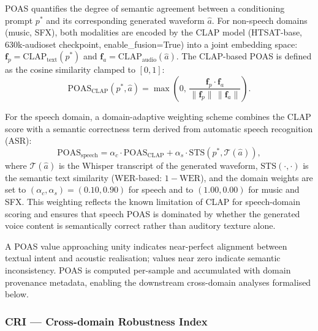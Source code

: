 \documentclass[journal]{IEEEtran}
\begin{document}
POAS quantifies the degree of semantic agreement between a
conditioning prompt $p^*$ and its corresponding generated waveform $\hat{a}$.
For non-speech domains (music, SFX), both modalities are encoded by
the CLAP model (HTSAT-base, 630k-audioset checkpoint, enable\_fusion=True)
into a joint embedding space:
$\mathbf{f}_p = \text{CLAP}_{\text{text}}(p^*)$ and
$\mathbf{f}_a = \text{CLAP}_{\text{audio}}(\hat{a})$. The CLAP-based
POAS is defined as the cosine similarity clamped to $[0,1]$:
\begin{equation}
  \text{POAS}_{\text{CLAP}}(p^*, \hat{a}) =
  \max\!\left(0,\,
  \frac{\mathbf{f}_p \cdot \mathbf{f}_a}
       {\|\mathbf{f}_p\|\,\|\mathbf{f}_a\|}
  \right).
  \label{eq:poas_clap}
\end{equation}

For the speech domain, a domain-adaptive weighting scheme combines the
CLAP score with a semantic correctness term derived from automatic
speech recognition (ASR):
\begin{equation}
  \text{POAS}_{\text{speech}} =
  \alpha_c \cdot \text{POAS}_{\text{CLAP}} +
  \alpha_s \cdot \text{STS}(p^*, \mathcal{T}(\hat{a})),
  \label{eq:poas_speech}
\end{equation}
where $\mathcal{T}(\hat{a})$ is the Whisper transcript of the generated
waveform, $\text{STS}(\cdot,\cdot)$ is the semantic text similarity
(WER-based: $1 - \text{WER}$), and the domain weights are set to
$(\alpha_c, \alpha_s) = (0.10, 0.90)$ for speech and to
$(1.00, 0.00)$ for music and SFX\@. This weighting reflects the known
limitation of CLAP for speech-domain scoring and ensures that speech
POAS is dominated by whether the generated voice content is semantically
correct rather than auditory texture alone.

A POAS value approaching unity indicates near-perfect alignment
between textual intent and acoustic realisation; values near zero
indicate semantic inconsistency. POAS is computed per-sample and
accumulated with domain provenance metadata, enabling the downstream
cross-domain analyses formalised below.

\subsubsection{CRI --- Cross-domain Robustness Index}
\end{document}
